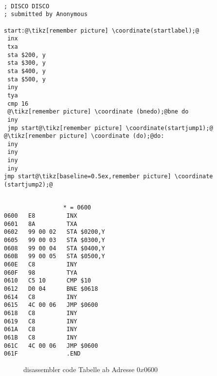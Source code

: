 \documentclass[a4paper]{article}
\begin{document}

\newpage

{\scriptsize
 \begin{lstlisting}[language=6502,escapechar=@]

; DISCO DISCO
; submitted by Anonymous
 
start:@\tikz[remember picture] \coordinate(startlabel);@
 inx
 txa
 sta $200, y
 sta $300, y
 sta $400, y
 sta $500, y
 iny
 tya
 cmp 16
 @\tikz[remember picture] \coordinate (bnedo);@bne do
 iny
 jmp start@\tikz[remember picture] \coordinate(startjump1);@
@\tikz[remember picture] \coordinate (do);@do:
 iny
 iny
 iny
 iny
jmp start@\tikz[baseline=0.5ex,remember picture] \coordinate (startjump2);@

 \end{lstlisting}%
}

{\scriptsize
 \begin{lstlisting}[language=6502,escapechar=@]

                 * = 0600
0600   E8         INX
0601   8A         TXA
0602   99 00 02   STA $0200,Y
0605   99 00 03   STA $0300,Y
0608   99 00 04   STA $0400,Y
060B   99 00 05   STA $0500,Y
060E   C8         INY
060F   98         TYA
0610   C5 10      CMP $10
0612   D0 04      BNE $0618
0614   C8         INY
0615   4C 00 06   JMP $0600
0618   C8         INY
0619   C8         INY
061A   C8         INY
061B   C8         INY
061C   4C 00 06   JMP $0600
061F              .END
 \end{lstlisting}%
}

\begin{figure}[h]
  \centering
\begin{minipage}[t]{.45\columnwidth} 
\end{minipage}\hfill
  \caption{disassembler code Tabelle ab Adresse $0x0600$  }
  \label{fig:cia}

\end{figure}
\end{document}
